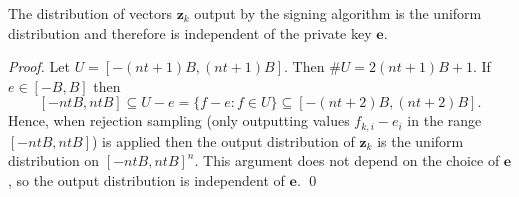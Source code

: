 \documentclass{llncs}
\newcommand{\e}{\mathbf{e}}
\newcommand{\z}{\mathbf{z}}
\begin{document}
\begin{lemma} \label{lem:sim2}
The distribution of vectors $\z_k$ output by the signing algorithm is the uniform distribution and therefore is independent of the private key $\e$.
\end{lemma}

\begin{proof}
Let $U = [-(nt+1)B, (nt+1)B]$. Then $\#U = 2(nt + 1)B + 1$.
If $e \in [-B, B]$ then 
\[
    [-ntB, ntB] \subseteq  U - e = \{ f - e : f \in U \} \subseteq [-(nt+2)B, (nt+2)B ].
\]
Hence, when rejection sampling (only outputting values $f_{k,i} - e_i$ in the range $[-ntB, ntB]$) is applied then the output distribution of $\z_k$ is the uniform distribution on $[-ntB, ntB]^n$.
This argument does not depend on the choice of $\e$, so the output distribution is independent of $\e$. \qed
\end{proof}
\end{document}
